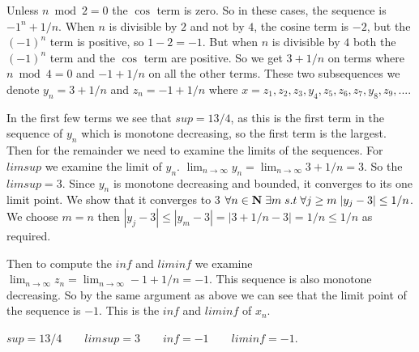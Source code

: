\documentclass[11pt]{article}
\begin{document}
Unless $n \bmod 2 = 0$ the $\cos$ term is zero. So in these cases, the sequence is $-1^n + 1/n$. When $n$ is divisible by $2$ and not by $4$, the cosine term is $-2$, but the $(-1)^n$ term is positive, so $1 - 2 = -1$. But when $n$ is divisible by $4$ both the $(-1)^n$ term and the $\cos$ term are positive. So we get 
$3 + 1/n$ on terms where $n \bmod 4 = 0$ and $-1 + 1/n$ on all the other terms. These two subsequences we denote $y_n = 3 + 1/n$ and $z_n = -1 + 1/n$ where 
$x = z_1, z_2, z_3, y_4, z_5, z_6, z_7, y_8, z_9, .... $


In the first few terms we see that $sup = 13/4$, as this is the first term in the sequence of $y_n$ which is monotone decreasing, so the first term is the largest. Then for the remainder we need to examine the limits of the sequences. For $limsup$ we examine the limit of $y_n$. $\lim_{n \to \infty} y_n = \lim_{n \to \infty} 3  + 1/n = 3$. So the $limsup = 3$. Since $y_n$ is monotone decreasing and bounded, it converges to its one limit point. We show that it converges to 3 $\forall n\in \mathbf{N} \; \exists m \; s.t \; \forall j \geq m \; |y_j - 3| \leq 1/n$. We choose $m = n$ then $|y_j - 3| \leq |y_m -3 | = |3 + 1/n -3| = 1/n \leq 1/n$ as required. 

Then to compute the $inf$ and $liminf$ we examine $\lim_{n \to \infty} z_n = \lim_{n \to \infty} -1 + 1/n = -1$. This sequence is also monotone decreasing. So by the same argument as above we can see that the limit point of the sequence is $-1$. This is the $inf$ and $liminf$ of $x_n$.

$sup = 13/4 \quad\quad limsup = 3 \quad\quad inf = -1 \quad\quad liminf = -1$. 
\end{document}
